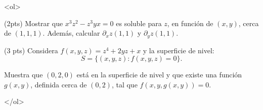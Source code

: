 \documentclass[12pt]{article}
\begin{document}
\bigskip

            
\bigskip
\bigskip
\bigskip






<ol>

\item (2pts) Mostrar que $x^3z^2-z^3yx=0$ es soluble para $z$, en función
  de $(x,y)$, cerca de $(1,1,1)$. Además, calcular $\partial_xz(1,1)$
  y $\partial_yz(1,1)$.

\vspace{5cm}


\item (3 pts) Considera $f(x,y,z)=z^4+2yz+x$ y la superficie de nivel:
$$
S=\{(x,y,z): f(x,y,z)=0\}.
$$

Muestra que $(0,2,0)$ está en la superficie de nivel y que existe
una función $g(x,y)$, definida cerca de $(0,2)$, tal que $f(x,y,g(x,y))=0$.


</ol>
 





  
\end{document}
